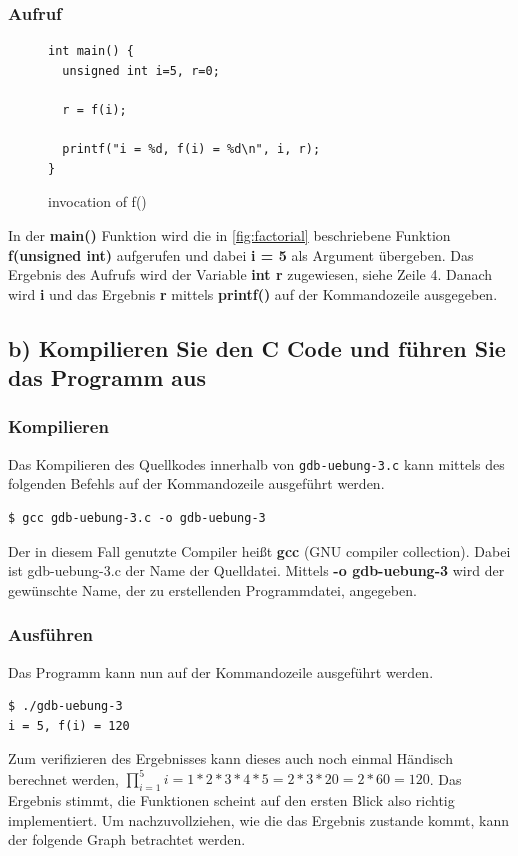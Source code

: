 \documentclass[12pt]{article}
\begin{document}
\subsubsection{Aufruf}
\begin{figure}[h]
\begin{lstlisting}
int main() {
  unsigned int i=5, r=0;

  r = f(i);

  printf("i = %d, f(i) = %d\n", i, r);
}
\end{lstlisting}
\label{fig:factorial-main}
\caption{invocation of f()}
\end{figure}

In der \textbf{main()} Funktion wird die in \ref{fig:factorial} beschriebene Funktion \textbf{f(unsigned int)} aufgerufen und dabei \textbf{i = 5} als Argument übergeben. Das Ergebnis des Aufrufs wird der Variable \textbf{int r} zugewiesen, siehe Zeile 4. Danach wird \textbf{i} und das Ergebnis \textbf{r} mittels \textbf{printf()} auf der Kommandozeile ausgegeben.

\subsection{b) Kompilieren Sie den C Code und führen Sie das Programm aus }
\subsubsection{Kompilieren}
Das Kompilieren des Quellkodes innerhalb von \texttt{gdb-uebung-3.c} kann mittels des folgenden Befehls auf der Kommandozeile ausgeführt werden.
\begin{lstlisting}
$ gcc gdb-uebung-3.c -o gdb-uebung-3
\end{lstlisting}
Der in diesem Fall genutzte Compiler heißt \textbf{gcc} (GNU compiler collection). Dabei ist gdb-uebung-3.c der Name der Quelldatei. Mittels \textbf{-o gdb-uebung-3} wird der gewünschte Name, der zu erstellenden Programmdatei, angegeben.

\subsubsection{Ausführen}
Das Programm kann nun auf der Kommandozeile ausgeführt werden.
\begin{lstlisting}
$ ./gdb-uebung-3                    
i = 5, f(i) = 120
\end{lstlisting}
Zum verifizieren des Ergebnisses kann dieses auch noch einmal Händisch berechnet werden, $ \prod_{i = 1}^{5} i = 1 * 2 * 3 * 4 * 5 = 2 * 3 * 20 = 2 * 60 = 120 $. Das Ergebnis stimmt, die Funktionen scheint auf den ersten Blick also richtig implementiert. Um nachzuvollziehen, wie die das Ergebnis zustande kommt, kann der folgende Graph betrachtet werden.
\end{document}
